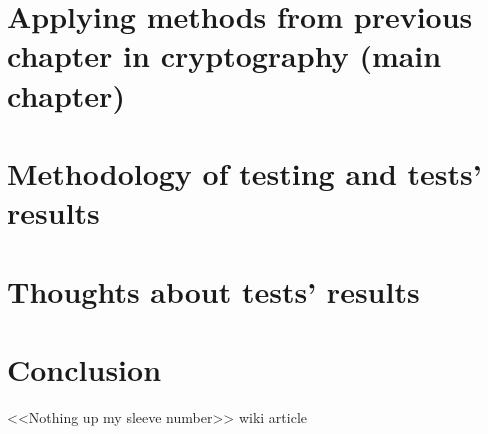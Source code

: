 \documentclass{article}
\begin{document}
\section{Applying methods from previous chapter in cryptography (main chapter)}

\section{Methodology of testing and tests' results}

\section{Thoughts about tests' results}

\section{Conclusion}





	 <<Nothing up my sleeve number>> wiki article
    
\end{document}
